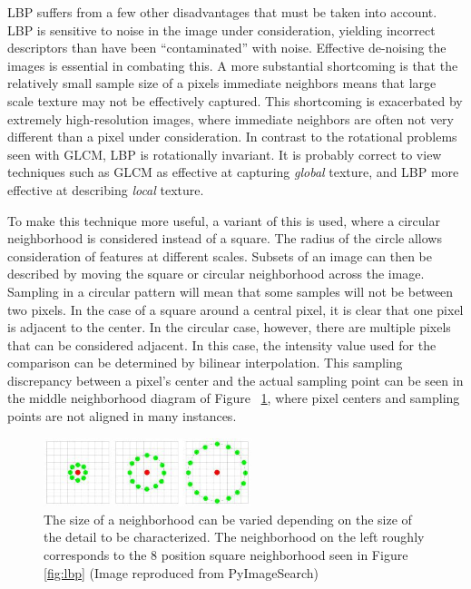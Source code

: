 \documentclass[letterpaper, notitlepage]{report}
\begin{document}
LBP suffers from a few other disadvantages that must be taken into account. LBP is sensitive to noise in the image under consideration, yielding incorrect descriptors than have been ``contaminated'' with noise. Effective de-noising the images is essential in combating this. A more substantial shortcoming is that the relatively small sample size of a pixels immediate neighbors means that large scale texture may not be effectively captured. This shortcoming is exacerbated by extremely high-resolution images, where immediate neighbors are often not very different than a pixel under consideration. In contrast to the rotational problems seen with GLCM, LBP is rotationally invariant. It is probably correct to view techniques such as GLCM as effective at capturing \textit{global} texture, and LBP more effective at describing \textit{local} texture.

To make this technique more useful, a variant of this is used, where a circular neighborhood is considered instead of a square. The radius of the circle allows consideration of features at different scales.  Subsets of an image can then be described by moving the square or circular neighborhood across the image.  Sampling in a circular pattern will mean that some samples will not be between two pixels. In the case of a square around a central pixel, it is clear that one pixel is adjacent to the center. In the circular case, however, there are multiple pixels that can be considered adjacent. In this case, the intensity value used for the comparison can be determined by bilinear interpolation. This sampling discrepancy between a pixel's center and the actual sampling point can be seen in the middle neighborhood diagram of Figure ~\ref{fig:lbp-circular}, where pixel centers and sampling points are not aligned in many instances.

\begin{figure}[H]
	\centering
	\includegraphics[height=2cm]{./figures/lbp_circular.jpg}	
	\caption[Local Binary Pattern circular neighborhoods]{The size of a neighborhood can be varied depending on the size of the detail to be characterized. The neighborhood on the left roughly corresponds to the 8 position square neighborhood seen in Figure \ref{fig:lbp} (Image reproduced from PyImageSearch)}
	\label{fig:lbp-circular}
\end{figure}
\end{document}

